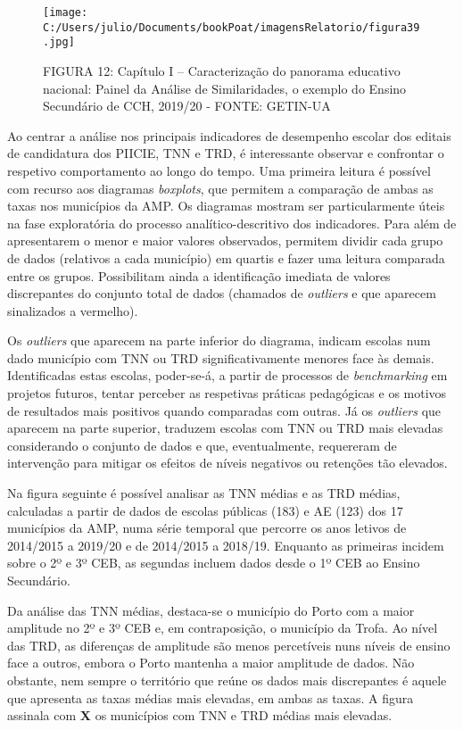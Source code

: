 \documentclass[
]{book}
\begin{document}
\begin{figure}
\centering
\texttt{[image: C:/Users/julio/Documents/bookPoat/imagensRelatorio/figura39.jpg]}
\caption{FIGURA 12: Capítulo I -- Caracterização do panorama educativo nacional: Painel da Análise de Similaridades, o exemplo do Ensino Secundário de CCH, 2019/20 - FONTE: GETIN-UA}
\end{figure}

Ao centrar a análise nos principais indicadores de desempenho escolar dos editais de candidatura dos PIICIE, TNN e TRD, é interessante observar e confrontar o respetivo comportamento ao longo do tempo. Uma primeira leitura é possível com recurso aos diagramas \emph{boxplots}, que permitem a comparação de ambas as taxas nos municípios da AMP. Os diagramas mostram ser particularmente úteis na fase exploratória do processo analítico-descritivo dos indicadores. Para além de apresentarem o menor e maior valores observados, permitem dividir cada grupo de dados (relativos a cada município) em quartis e fazer uma leitura comparada entre os grupos. Possibilitam ainda a identificação imediata de valores discrepantes do conjunto total de dados (chamados de \emph{outliers} e que aparecem sinalizados a vermelho).

Os \emph{outliers} que aparecem na parte inferior do diagrama, indicam escolas num dado município com TNN ou TRD significativamente menores face às demais. Identificadas estas escolas, poder-se-á, a partir de processos de \emph{benchmarking} em projetos futuros, tentar perceber as respetivas práticas pedagógicas e os motivos de resultados mais positivos quando comparadas com outras. Já os \emph{outliers} que aparecem na parte superior, traduzem escolas com TNN ou TRD mais elevadas considerando o conjunto de dados e que, eventualmente, requereram de intervenção para mitigar os efeitos de níveis negativos ou retenções tão elevados.

Na figura seguinte é possível analisar as TNN médias e as TRD médias, calculadas a partir de dados de escolas públicas (183) e AE (123) dos 17 municípios da AMP, numa série temporal que percorre os anos letivos de 2014/2015 a 2019/20 e de 2014/2015 a 2018/19. Enquanto as primeiras incidem sobre o 2º e 3º CEB, as segundas incluem dados desde o 1º CEB ao Ensino Secundário.

Da análise das TNN médias, destaca-se o município do Porto com a maior amplitude no 2º e 3º CEB e, em contraposição, o município da Trofa. Ao nível das TRD, as diferenças de amplitude são menos percetíveis nuns níveis de ensino face a outros, embora o Porto mantenha a maior amplitude de dados. Não obstante, nem sempre o território que reúne os dados mais discrepantes é aquele que apresenta as taxas médias mais elevadas, em ambas as taxas. A figura assinala com \textbf{X} os municípios com TNN e TRD médias mais elevadas.
\end{document}
